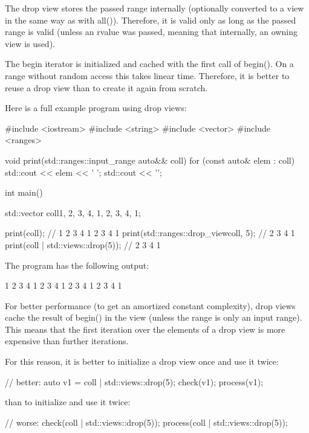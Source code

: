 The drop view stores the passed range internally (optionally converted to a view in the same way as with all()). Therefore, it is valid only as long as the passed range is valid (unless an rvalue was passed, meaning that internally, an owning view is used).

The begin iterator is initialized and cached with the first call of begin(). On a range without random access this takes linear time. Therefore, it is better to reuse a drop view than to create it again from scratch.

Here is a full example program using drop views:


\begin{cpp}
#include <iostream>
#include <string>
#include <vector>
#include <ranges>

void print(std::ranges::input_range auto&& coll)
{
	for (const auto& elem : coll) {
		std::cout << elem << ' ';
	}
	std::cout << '\n';
}

int main()
{
	std::vector coll{1, 2, 3, 4, 1, 2, 3, 4, 1};
	
	print(coll); // 1 2 3 4 1 2 3 4 1
	print(std::ranges::drop_view{coll, 5}); // 2 3 4 1
	print(coll | std::views::drop(5)); // 2 3 4 1
}
\end{cpp}

The program has the following output:

\begin{shell}
1 2 3 4 1 2 3 4 1
2 3 4 1
2 3 4 1
\end{shell}


For better performance (to get an amortized constant complexity), drop views cache the result of begin() in the view (unless the range is only an input range). This means that the first iteration over the elements of a drop view is more expensive than further iterations.

For this reason, it is better to initialize a drop view once and use it twice:

\begin{cpp}
// better:
auto v1 = coll | std::views::drop(5);
check(v1);
process(v1);
\end{cpp}

than to initialize and use it twice:

\begin{cpp}
// worse:
check(coll | std::views::drop(5));
process(coll | std::views::drop(5));
\end{cpp}


